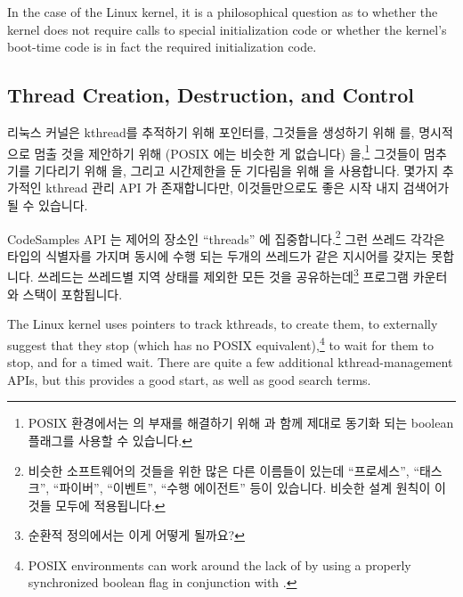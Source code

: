 In the case of the Linux kernel, it is a philosophical question as to
whether the kernel does not require calls to special initialization
code or whether the kernel's boot-time code is in fact the required
initialization code.

\fi

\subsection{Thread Creation, Destruction, and Control}
\label{sec:toolsoftrade:Thread Creation, Destruction, and Control}

리눅스 커널은 kthread를 추적하기 위해  포인터를,
그것들을 생성하기 위해  를, 명시적으로 멈출 것을
제안하기 위해 (POSIX 에는 비슷한 게 없습니다) 
을,\footnote{
	POSIX 환경에서는  의 부재를 해결하기 위해
	 과 함께 제대로 동기화 되는 boolean 플래그를 사용할
	수 있습니다.}
그것들이 멈추기를 기다리기 위해  을, 그리고 시간제한을 둔
기다림을 위해  을 사용합니다.
몇가지 추가적인 kthread 관리 API 가 존재합니다만, 이것들만으로도 좋은 시작 내지
검색어가 될 수 있습니다.

CodeSamples API 는 제어의 장소인 ``threads'' 에 집중합니다.\footnote{
	비슷한 소프트웨어의 것들을 위한 많은 다른 이름들이 있는데 ``프로세스'',
	``태스크'', ``파이버'', ``이벤트'', ``수행 에이전트'' 등이 있습니다.
	비슷한 설계 원칙이 이것들 모두에 적용됩니다.}
그런 쓰레드 각각은  타입의 식별자를 가지며 동시에 수행 되는
두개의 쓰레드가 같은 지시어를 갖지는 못합니다.
쓰레드는 쓰레드별 지역 상태를 제외한 모든 것을 공유하는데\footnote{
	순환적 정의에서는 이게 어떻게 될까요?}
프로그램 카운터와 스택이 포함됩니다.

\iffalse

The Linux kernel uses
 pointers to track kthreads,
 to create them,
 to externally suggest that they stop
(which has no POSIX equivalent),\footnote{
	POSIX environments can work around the lack of
	 by using a properly synchronized
	boolean flag in conjunction with .}
 to wait for them to stop, and
 for a timed wait.
There are quite a few additional kthread-management APIs, but this
provides a good start, as well as good search terms.

